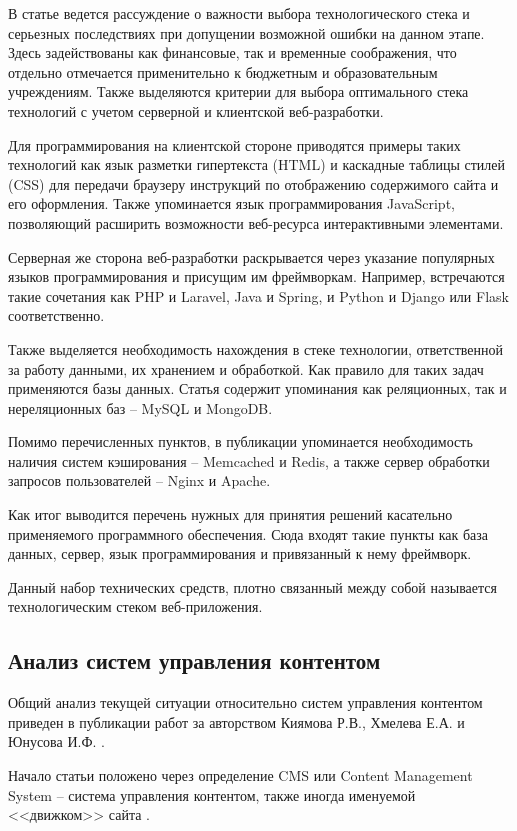 В статье ведется рассуждение о важности выбора технологического стека и серьезных последствиях при допущении возможной ошибки на данном этапе.
Здесь задействованы как финансовые, так и временные соображения, что отдельно отмечается применительно к бюджетным и образовательным учреждениям.
Также выделяются критерии для выбора оптимального стека технологий с учетом серверной и клиентской веб-разработки.

Для программирования на клиентской стороне приводятся примеры таких технологий как язык разметки гипертекста (HTML) и каскадные таблицы стилей (CSS) для передачи браузеру инструкций по отображению содержимого сайта и его оформления.
Также упоминается язык программирования JavaScript, позволяющий расширить возможности веб-ресурса интерактивными элементами.

Серверная же сторона веб-разработки раскрывается через указание популярных языков программирования и присущим им фреймворкам.
Например, встречаются такие сочетания как PHP и Laravel, Java и Spring, и Python и Django или Flask соответственно.

Также выделяется необходимость нахождения в стеке технологии, ответственной за работу данными, их хранением и обработкой.
Как правило для таких задач применяются базы данных.
Статья содержит упоминания как реляционных, так и нереляционных баз -- MySQL и MongoDB.

Помимо перечисленных пунктов, в публикации упоминается необходимость наличия систем кэширования -- Memcached и Redis, а также сервер обработки запросов пользователей -- Nginx и Apache.

Как итог выводится перечень нужных для принятия решений касательно применяемого программного обеспечения.
Сюда входят такие пункты как база данных, сервер, язык программирования и привязанный к нему фреймворк.

Данный набор технических средств, плотно связанный между собой называется технологическим стеком \cite{ualiev-jebegenov-issledovanie-1} веб-приложения.


\subsection{Анализ систем управления контентом}

Общий анализ текущей ситуации относительно систем управления контентом приведен в публикации работ за авторством Киямова Р.В., Хмелева Е.А. и Юнусова И.Ф. \cite{kiyamov-cms}.

Начало статьи положено через определение CMS или Content Management System -- система управления контентом, также иногда именуемой <<движком>> сайта \cite{kiyamov-cms-1}.

